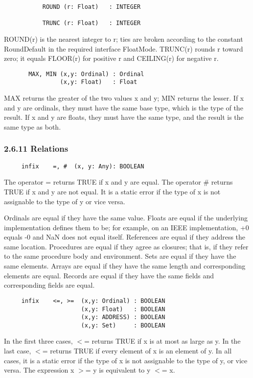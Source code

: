 \documentclass[10pt]{article}
\begin{document}
\begin{verbatim}
           ROUND (r: Float)   : INTEGER

           TRUNC (r: Float)   : INTEGER
\end{verbatim}
ROUND(r) is the nearest integer to r; ties are broken according to the
constant RoundDefault in the required interface FloatMode.  TRUNC(r) rounds r
toward zero; it equals FLOOR(r) for positive r and CEILING(r) for negative r.

\begin{verbatim}
       MAX, MIN (x,y: Ordinal) : Ordinal
                (x,y: Float)   : Float
\end{verbatim}
MAX returns the greater of the two values x and y; MIN returns the lesser.  If
x and y are ordinals, they must have the same base type, which is the type of
the result.  If x and y are floats, they must have the same type, and the
result is the same type as both.

\subsubsection*{2.6.11 Relations}

\begin{verbatim}
     infix    =, #  (x, y: Any): BOOLEAN
\end{verbatim}
The operator = returns TRUE if x and y are equal.  The operator \# returns
TRUE if x and y are not equal.  It is a static error if the type of x is not
assignable to the type of y or vice versa.

Ordinals are equal if they have the same value.  Floats are equal if the
underlying implementation defines them to be; for example, on an IEEE
implementation, +0 equals -0 and NaN does not equal itself.  References are
equal if they address the same location.  Procedures are equal if they agree
as closures; that is, if they refer to the same procedure body and
environment.  Sets are equal if they have the same elements.  Arrays are equal
if they have the same length and corresponding elements are equal.  Records
are equal if they have the same fields and corresponding fields are equal.

\begin{verbatim}
     infix    <=, >=  (x,y: Ordinal) : BOOLEAN
                      (x,y: Float)   : BOOLEAN
                      (x,y: ADDRESS) : BOOLEAN
                      (x,y: Set)     : BOOLEAN
\end{verbatim}
In the first three cases, $<$= returns TRUE if x is at most as large as y.  In
the last case, $<$= returns TRUE if every element of x is an element of y.  In
all cases, it is a static error if the type of x is not assignable to the type
of y, or vice versa.  The expression x $>$= y is equivalent to y $<$= x.
\end{document}
